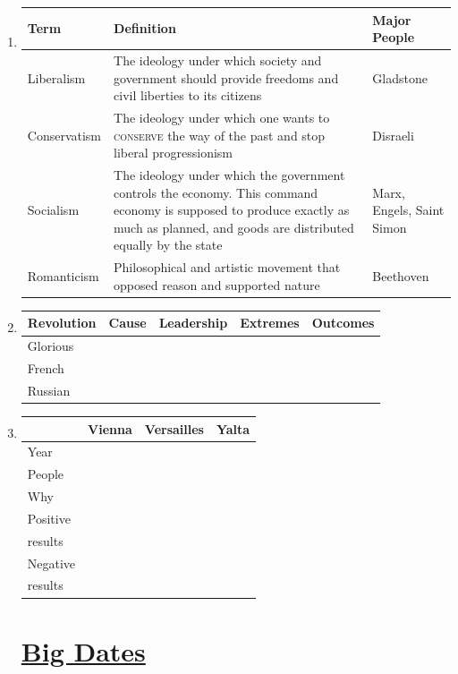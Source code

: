 \documentclass[12pt]{article}
\begin{document}
\begin{enumerate}
\begin{tabular}{|l|l|l|}
\end{tabular}

\item \begin{tabular}{|p{}|p{}|p{}|}

\hline
Term & Definition & Major People \\
\hline
Liberalism & The ideology under which society and government should provide freedoms and civil liberties to its citizens & Gladstone \\
\hline
Conservatism & The ideology under which one wants to \textsc{conserve} the way of the past and stop liberal progressionism & Disraeli \\
\hline
Socialism & The ideology under which the government controls the economy. This command economy is supposed to produce exactly as much as planned, and goods are distributed equally by the state  & Marx, Engels, Saint Simon \\
\hline
Romanticism & Philosophical and artistic movement that opposed reason and supported nature & Beethoven \\
\hline
\end{tabular}

\item \begin{tabular}{|l|l|l|l|l|}

\hline
Revolution & Cause & Leadership & Extremes & Outcomes \\
\hline
Glorious & & & & \\
\hline
French & & & & \\
\hline
Russian & & & & \\
\hline
\end{tabular}

\item \begin{tabular}{|l|l|l|l|} 

\hline
& Vienna & Versailles & Yalta \\
\hline
Year & & & \\
\hline
People & & & \\
\hline
Why & & & \\
\hline
Positive & & & \\
results & & & \\
\hline
Negative & & & \\
results & & & \\
\hline
\end{tabular}
\section{\underline{Big Dates}}



\end{enumerate}
\end{document}
